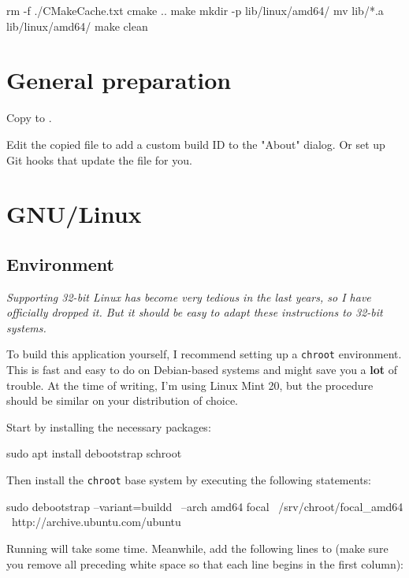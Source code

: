 \begin{Verbatim64}
  rm -f ./CMakeCache.txt
  cmake ..
  make
  mkdir -p lib/linux/amd64/
  mv lib/*.a lib/linux/amd64/
  make clean
\end{Verbatim64}

\section{General preparation}
\label{sec:general_preparation}

Copy  to .

Edit the copied file to add a custom build ID to the "About" dialog.
Or set up Git hooks that update the file for you.

\newpage %

\section{GNU/Linux}

\subsection{Environment}

\emph{Supporting 32-bit Linux has become very tedious in the last
  years, so I have officially dropped it.  But it should be easy to
  adapt these instructions to 32-bit systems.}

To build this application yourself, I recommend setting up a
\texttt{chroot} environment.  This is fast and easy to do on
Debian-based systems and might save you a \textbf{lot} of trouble.  At
the time of writing, I'm using Linux Mint 20, but the procedure should
be similar on your distribution of choice.

Start by installing the necessary packages:

\begin{VerbatimBoth}
  sudo apt install debootstrap schroot
\end{VerbatimBoth}

Then install the \texttt{chroot} base system by executing the
following statements:

\begin{Verbatim64}
  sudo debootstrap --variant=buildd \
    --arch amd64 focal \
    /srv/chroot/focal_amd64 \
    http://archive.ubuntu.com/ubuntu
\end{Verbatim64}

Running  will take some time.  Meanwhile, add the
following lines to  (make sure you
remove all preceding white space so that each line begins in the first
column):

